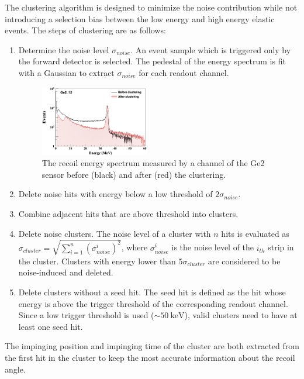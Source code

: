 \documentclass[number,5p]{elsarticle}
\begin{document}
The clustering algorithm is designed to minimize the noise contribution while
not introducing a selection bias between the low energy and high energy elastic events.
The steps of clustering are as follows:
\begin{enumerate}
\item Determine the noise level $\sigma_{noise}$. An event sample which is
  triggered only by the forward detector is selected.
  The pedestal of the energy spectrum is fit with a Gaussian to extract $\sigma_{noise}$ for each
  readout channel.
  \begin{figure}[b]
    \centering
    \includegraphics[width=0.45\textwidth]{./clustering.png}
    \caption{The recoil energy spectrum measured by a channel of the Ge2 sensor before (black) and after (red) the clustering.}
    \label{fig:clustering}
  \end{figure}
\item Delete noise hits with energy below a low threshold of $2\sigma_{noise}$.
\item Combine adjacent hits that are above threshold into clusters.
\item Delete noise clusters. The noise level of a cluster with $n$ hits is evaluated as
  $\sigma_{cluster} = \sqrt{\sum_{i=1}^n{(\sigma_{noise}^i)^2}}$, where $\sigma_{noise}^i$ is
  the noise level of the $i_{th}$ strip in the cluster. Clusters with energy lower than $5\sigma_{cluster}$ are considered to be noise-induced and deleted.
\item Delete clusters without a seed hit. The seed hit is defined as the
  hit whose energy is above the trigger threshold of the corresponding readout
  channel. Since a low trigger threshold is used ($\sim\SI{50}{\keV}$), valid clusters need to have at least one seed hit.
\end{enumerate}
The impinging position and impinging time of the cluster are both extracted from the first
hit in the cluster to keep the most accurate information about the recoil angle.
\end{document}

